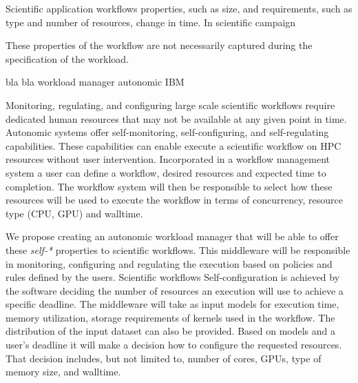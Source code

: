 Scientific application workflows properties, such as size, and requirements, such 
as type and number of resources, change in time. In scientific campaign

These properties of the workflow are not necessarily captured during the 
specification of the workload. 

bla bla workload manager autonomic IBM~\cite{ibm2005autonomic}

Monitoring, regulating, and configuring large scale scientific workflows require 
dedicated human resources that may not be available at any given point in time. 
Autonomic systems offer self-monitoring, self-configuring, and self-regulating 
capabilities. These capabilities can enable execute a scientific workflow on HPC 
resources without user intervention. Incorporated in a workflow management system 
a user can define a workflow, desired resources and expected time to completion. 
The workflow system will then be responsible to select how these resources will 
be used to execute the workflow in terms of concurrency, resource type (CPU, GPU) 
and walltime.


We propose creating an autonomic workload manager that will be able to offer these 
\textit{self-*} properties to scientific workflows. This middleware will be 
responsible in monitoring, configuring and regulating the execution based on 
policies and rules defined by the users. 
Scientific workflows 
Self-configuration is achieved by the software deciding the number of resources 
an execution will use to achieve a specific deadline. The middleware will take 
as input models for execution time, memory utilization, storage requirements of 
kernels used in the workflow. The distribution of the input dataset can also be 
provided. Based on models and a user's deadline it will make a decision how to 
configure the requested resources. That decision includes, but not limited to, 
number of cores, GPUs, type of memory size, and walltime.

